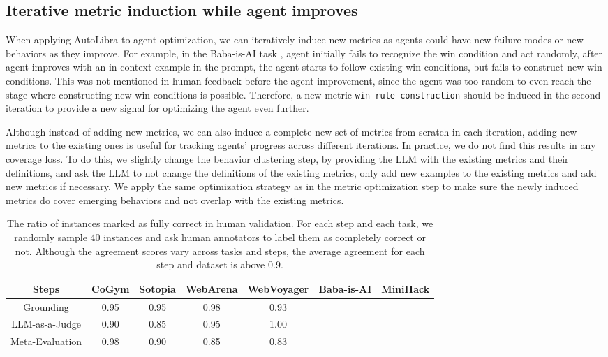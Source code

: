 \subsection{Iterative metric induction while agent improves}
\label{sec:iterative-induction}
When applying AutoLibra to agent optimization, we can iteratively induce new metrics as agents could
have new failure modes or new behaviors as they improve.
For example, in the Baba-is-AI task \citep[\S\ref{sec:baba-is-ai}]{cloos2024babaaibreakrules},
agent initially fails to recognize the win condition and act randomly,
after agent improves with an in-context example in the prompt, the agent starts to 
follow existing win conditions, but fails to construct new win conditions.
This was not mentioned in human feedback before the agent improvement, since the agent
was too random to even reach the stage where constructing new win conditions is possible.
Therefore, a new metric \texttt{win-rule-construction} should be induced in the second iteration 
to provide a new signal for optimizing the agent even further.

Although instead of adding new metrics, we can also induce a complete new set of metrics from scratch
in each iteration, adding new metrics to the existing ones is useful for tracking agents' progress
across different iterations. In practice, we do not find this results in any coverage loss. 
To do this, we slightly change the behavior clustering step, by providing the LLM with the existing metrics
and their definitions, and ask the LLM to not change the definitions of the existing metrics, 
only add new examples to the existing metrics and add new metrics if necessary.
We apply the same optimization strategy as in the metric optimization step
to make sure the newly induced metrics do cover emerging behaviors and not overlap with the existing metrics.

\begin{table}[!t]
    \centering
    \small
    \begin{tabular}{ccccccc}
        \toprule
        Steps & CoGym & Sotopia & WebArena & WebVoyager & Baba-is-AI & MiniHack  \\
        \midrule
        Grounding & 0.95 & 0.95 & 0.98 & 0.93 &  &  \\
        LLM-as-a-Judge & 0.90 & 0.85 & 0.95 & 1.00 &  & \\
        Meta-Evaluation & 0.98 & 0.90 & 0.85 & 0.83 &  &  \\
        \bottomrule
    \end{tabular}
    \caption{
        The ratio of instances marked as fully correct in human validation. For each step and
        each task, we randomly sample 40 instances and ask human annotators to label them as completely correct
        or not. Although the agreement scores vary across tasks and steps, the average agreement for each
        step and dataset is above 0.9. 
}
    \label{tab:validation}
\end{table}

